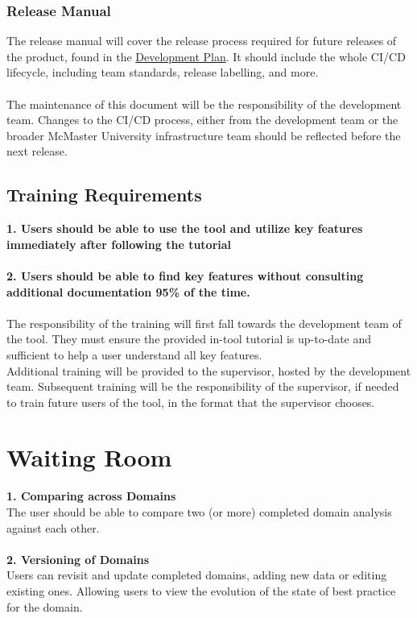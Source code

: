 \documentclass[12pt]{article}
\begin{document}
\subsubsection{Release Manual}
The release manual will cover the release process required for future releases of the product, found in the \href{https://github.com/thaafei/DomainX/blob/main/docs/DevelopmentPlan/DevelopmentPlan.pdf}{Development Plan}. It should include the whole CI/CD lifecycle, including team standards, release labelling, and more.\\
\\The maintenance of this document will be the responsibility of the development team. Changes to the CI/CD process, either from the development team or the broader McMaster University infrastructure team should be reflected before the next release.

\subsection{Training Requirements}
\textbf{1. Users should be able to use the tool and utilize key features immediately after following the tutorial} \\ \\
\textbf{2. Users should be able to find key features without consulting additional documentation 95\% of the time.} \\ \\
The responsibility of the training will first fall towards the development team of the tool. They must ensure the provided in-tool tutorial is up-to-date and sufficient to help a user understand all key features.
\\ Additional training will be provided to the supervisor, hosted by the development team.
Subsequent training will be the responsibility of the supervisor, if needed to train future users of the tool, in the format that the supervisor chooses.
\section{Waiting Room}
\textbf{1. Comparing across Domains}\\
The user should be able to compare two (or more) completed domain analysis against each other. \\\\
\textbf{2. Versioning of Domains}\\
Users can revisit and update completed domains, adding new data or editing existing ones. Allowing users to view the evolution of the state of best practice for the domain.
\end{document}
